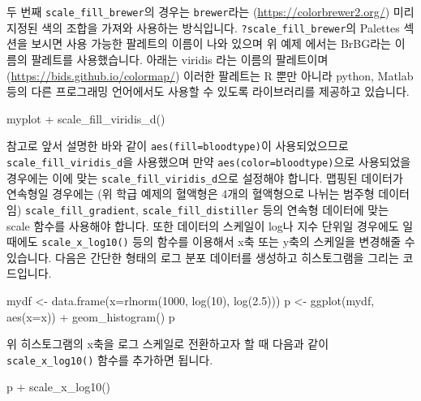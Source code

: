 \documentclass[
]{book}
\newenvironment{Shaded}{\begin{snugshade}}{\end{snugshade}}
\newcommand{\AttributeTok}[1]{\textcolor[rgb]{0.77,0.63,0.00}{#1}}
\newcommand{\DecValTok}[1]{\textcolor[rgb]{0.00,0.00,0.81}{#1}}
\newcommand{\FloatTok}[1]{\textcolor[rgb]{0.00,0.00,0.81}{#1}}
\newcommand{\FunctionTok}[1]{\textcolor[rgb]{0.00,0.00,0.00}{#1}}
\newcommand{\NormalTok}[1]{#1}
\newcommand{\OtherTok}[1]{\textcolor[rgb]{0.56,0.35,0.01}{#1}}
\newcommand{\SpecialCharTok}[1]{\textcolor[rgb]{0.00,0.00,0.00}{#1}}
\begin{document}
두 번째 \texttt{scale\_fill\_brewer}의 경우는 \texttt{brewer}라는 (\url{https://colorbrewer2.org/}) 미리 지정된 색의 조합을 가져와 사용하는 방식입니다. \texttt{?scale\_fill\_brewer}의 Palettes 섹션을 보시면 사용 가능한 팔레트의 이름이 나와 있으며 위 예제 에서는 BrBG라는 이름의 팔레트를 사용했습니다. 아래는 viridis 라는 이름의 팔레트이며 (\url{https://bids.github.io/colormap/}) 이러한 팔레트는 R 뿐만 아니라 python, Matlab 등의 다른 프로그래밍 언어에서도 사용할 수 있도록 라이브러리를 제공하고 있습니다.

\begin{Shaded}
\begin{Highlighting}[]
\NormalTok{myplot }\SpecialCharTok{+} 
  \FunctionTok{scale\_fill\_viridis\_d}\NormalTok{()}
\end{Highlighting}
\end{Shaded}

참고로 앞서 설명한 바와 같이 \texttt{aes(fill=bloodtype)}이 사용되었으므로 \texttt{scale\_fill\_viridis\_d}을 사용했으며 만약 \texttt{aes(color=bloodtype)}으로 사용되었을 경우에는 이에 맞는 \texttt{scale\_fill\_viridis\_d}으로 설정해야 합니다. 맵핑된 데이터가 연속형일 경우에는 (위 학급 예제의 혈액형은 4개의 혈액형으로 나뉘는 범주형 데이터임) \texttt{scale\_fill\_gradient}, \texttt{scale\_fill\_distiller} 등의 연속형 데이터에 맞는 scale 함수를 사용해야 합니다. 또한 데이터의 스케일이 log나 지수 단위일 경우에도 일 때에도 \texttt{scale\_x\_log10()} 등의 함수를 이용해서 x축 또는 y축의 스케일을 변경해줄 수 있습니다. 다음은 간단한 형태의 로그 분포 데이터를 생성하고 히스토그램을 그리는 코드입니다.

\begin{Shaded}
\begin{Highlighting}[]
\NormalTok{mydf }\OtherTok{\textless{}{-}} \FunctionTok{data.frame}\NormalTok{(}\AttributeTok{x=}\FunctionTok{rlnorm}\NormalTok{(}\DecValTok{1000}\NormalTok{, }\FunctionTok{log}\NormalTok{(}\DecValTok{10}\NormalTok{), }\FunctionTok{log}\NormalTok{(}\FloatTok{2.5}\NormalTok{)))}
\NormalTok{p }\OtherTok{\textless{}{-}} \FunctionTok{ggplot}\NormalTok{(mydf, }\FunctionTok{aes}\NormalTok{(}\AttributeTok{x=}\NormalTok{x)) }\SpecialCharTok{+}
  \FunctionTok{geom\_histogram}\NormalTok{()}
\NormalTok{p}
\end{Highlighting}
\end{Shaded}

위 히스토그램의 x축을 로그 스케일로 전환하고자 할 때 다음과 같이 \texttt{scale\_x\_log10()} 함수를 추가하면 됩니다.

\begin{Shaded}
\begin{Highlighting}[]
\NormalTok{p }\SpecialCharTok{+} \FunctionTok{scale\_x\_log10}\NormalTok{()}
\end{Highlighting}
\end{Shaded}
\end{document}
